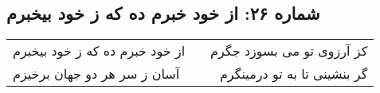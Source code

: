 \begin{center}
\section*{شماره ۲۶: از خود خبرم ده که ز خود بیخبرم}
\label{sec:026}
\begin{longtable}{l p{0.5cm} r}
از خود خبرم ده که ز خود بیخبرم
&&
کز آرزوی تو می بسوزد جگرم
\\
آسان ز سر هر دو جهان برخیزم
&&
گر بنشینی تا به تو درمینگرم
\\
\end{longtable}
\end{center}

